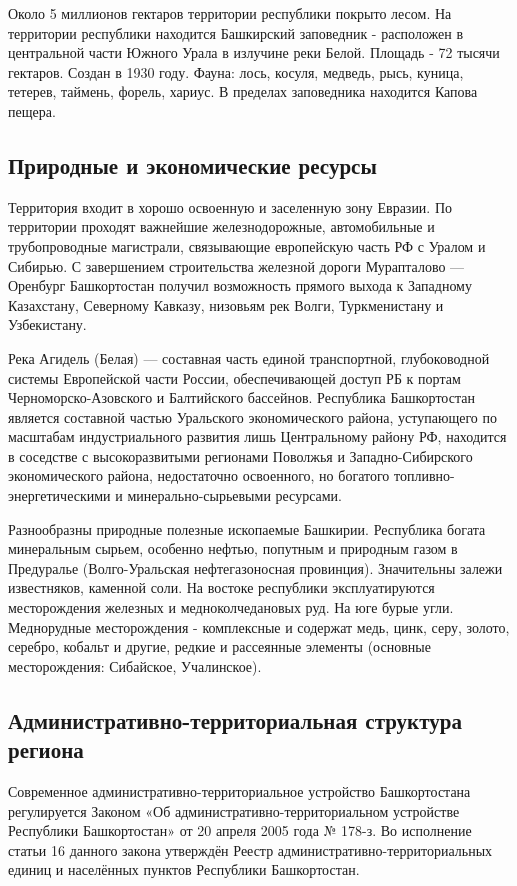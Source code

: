 Около 5 миллионов гектаров территории республики покрыто лесом. На территории республики находится Башкирский заповедник - расположен в центральной части Южного Урала в излучине реки Белой. Площадь - 72 тысячи гектаров. Создан в 1930 году. Фауна: лось, косуля, медведь, рысь, куница, тетерев, таймень, форель, хариус. В пределах заповедника находится Капова пещера.

\subsection{Природные и экономические ресурсы}

Территория входит в хорошо освоенную и заселенную зону Евразии. По территории проходят важнейшие железнодорожные, автомобильные и трубопроводные магистрали, связывающие европейскую часть РФ с Уралом и Сибирью. С завершением строительства железной дороги Мурапталово — Оренбург Башкортостан получил возможность прямого выхода к Западному Казахстану, Северному Кавказу, низовьям рек Волги, Туркменистану и Узбекистану.

Река Агидель (Белая) — составная часть единой транспортной, глубоководной системы Европейской части России, обеспечивающей доступ РБ к портам Черноморско-Азовского и Балтийского бассейнов. Республика Башкортостан является составной частью Уральского экономического района, уступающего по масштабам индустриального развития лишь Центральному району РФ, находится в соседстве с высокоразвитыми регионами Поволжья и Западно-Сибирского экономического района, недостаточно освоенного, но богатого топливно-энергетическими и минерально-сырьевыми ресурсами.

Разнообразны природные полезные ископаемые Башкирии. Республика богата минеральным сырьем, особенно нефтью, попутным и природным газом в Предуралье (Волго-Уральская нефтегазоносная провинция). Значительны залежи известняков, каменной соли. На востоке республики эксплуатируются месторождения железных и медноколчедановых руд. На юге  бурые угли. Меднорудные месторождения - комплексные и содержат медь, цинк, серу, золото, серебро, кобальт и другие, редкие и рассеянные элементы (основные месторождения: Сибайское, Учалинское).

\subsection{Административно-территориальная структура региона}

Современное административно-территориальное устройство Башкортостана регулируется Законом «Об административно-территориальном устройстве Республики Башкортостан» от 20 апреля 2005 года № 178-з. Во исполнение статьи 16 данного закона утверждён Реестр административно-территориальных единиц и населённых пунктов Республики Башкортостан.

